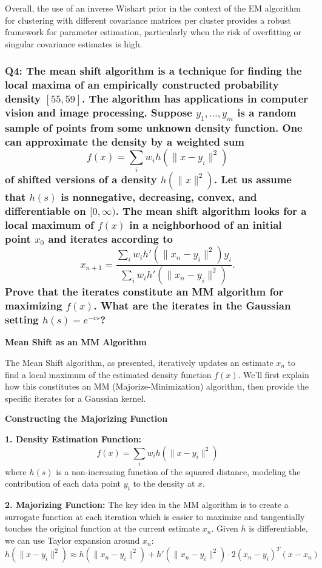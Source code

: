 \documentclass[8pt]{article}
\begin{document}
Overall, the use of an inverse Wishart prior in the context of the EM algorithm for clustering with different covariance matrices per cluster provides a robust framework for parameter estimation, particularly when the risk of overfitting or singular covariance estimates is high.

\subsubsection*{Q4: The mean shift algorithm is a technique for finding the local maxima of an empirically constructed probability density \([55, 59]\). The algorithm has applications in computer vision and image processing. Suppose \( y_1, \ldots, y_m \) is a random sample of points from some unknown density function. One can approximate the density by a weighted sum
\[
f(x) = \sum_i w_i h(\|x - y_i\|^2)
\]
of shifted versions of a density \( h(\|x\|^2) \). Let us assume that \( h(s) \) is nonnegative, decreasing, convex, and differentiable on \([0, \infty)\). The mean shift algorithm looks for a local maximum of \( f(x) \) in a neighborhood of an initial point \( x_0 \) and iterates according to
\[
x_{n+1} = \frac{\sum_i w_i h'(\|x_n - y_i\|^2) y_i}{\sum_i w_i h'(\|x_n - y_i\|^2)}.
\]
Prove that the iterates constitute an MM algorithm for maximizing \( f(x) \). What are the iterates in the Gaussian setting \( h(s) = e^{-cs} \)?}

\textbf{Mean Shift as an MM Algorithm}

The Mean Shift algorithm, as presented, iteratively updates an estimate \(x_n\) to find a local maximum of the estimated density function \(f(x)\). We'll first explain how this constitutes an MM (Majorize-Minimization) algorithm, then provide the specific iterates for a Gaussian kernel.

\textbf{Constructing the Majorizing Function}

\textbf{1. Density Estimation Function:}
   \[
   f(x) = \sum_i w_i h(\|x - y_i\|^2)
   \]
   where \(h(s)\) is a non-increasing function of the squared distance, modeling the contribution of each data point \(y_i\) to the density at \(x\).

\textbf{2. Majorizing Function:}
   The key idea in the MM algorithm is to create a surrogate function at each iteration which is easier to maximize and tangentially touches the original function at the current estimate \(x_n\). Given \(h\) is differentiable, we can use Taylor expansion around \(x_n\):
   \[
   h(\|x - y_i\|^2) \approx h(\|x_n - y_i\|^2) + h'(\|x_n - y_i\|^2) \cdot 2(x_n - y_i)^T (x - x_n)
   \]
\end{document}
